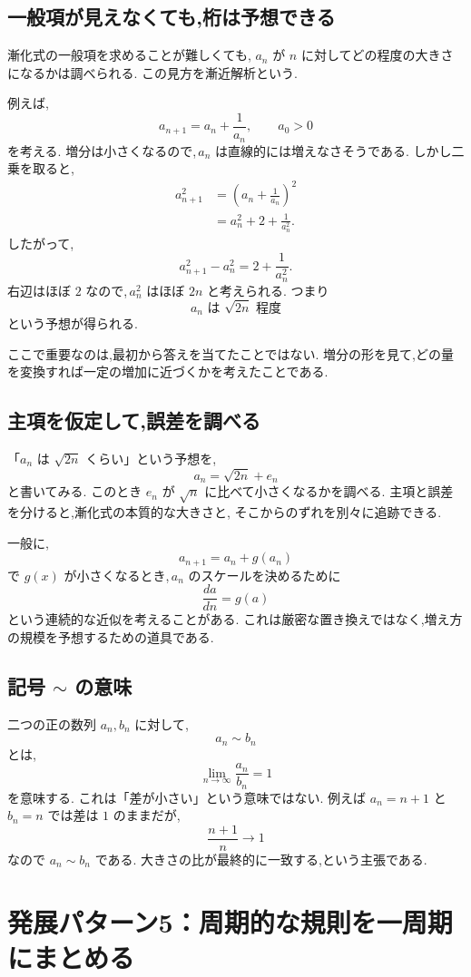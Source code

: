 \subsection{一般項が見えなくても,桁は予想できる}

漸化式の一般項を求めることが難しくても,
$a_n$ が $n$ に対してどの程度の大きさになるかは調べられる.
この見方を漸近解析という.

例えば,
\[
  a_{n+1}=a_n+\frac1{a_n},\qquad a_0>0
\]
を考える.
増分は小さくなるので,\,$a_n$ は直線的には増えなさそうである.
しかし二乗を取ると,
\[
\begin{aligned}
  a_{n+1}^2
  &=\left(a_n+\frac1{a_n}\right)^2\\
  &=a_n^2+2+\frac1{a_n^2}.
\end{aligned}
\]
したがって,
\[
  a_{n+1}^2-a_n^2=2+\frac1{a_n^2}.
\]
右辺はほぼ $2$ なので,\,$a_n^2$ はほぼ $2n$ と考えられる.
つまり
\[
  a_n\text{ は }\sqrt{2n}\text{ 程度}
\]
という予想が得られる.

ここで重要なのは,最初から答えを当てたことではない.
増分の形を見て,どの量を変換すれば一定の増加に近づくかを考えたことである.

\subsection{主項を仮定して,誤差を調べる}

「$a_n$ は $\sqrt{2n}$ くらい」という予想を,
\[
  a_n=\sqrt{2n}+e_n
\]
と書いてみる.
このとき $e_n$ が $\sqrt{n}$ に比べて小さくなるかを調べる.
主項と誤差を分けると,漸化式の本質的な大きさと,
そこからのずれを別々に追跡できる.

一般に,
\[
  a_{n+1}=a_n+g(a_n)
\]
で $g(x)$ が小さくなるとき,\,$a_n$ のスケールを決めるために
\[
  \frac{da}{dn}=g(a)
\]
という連続的な近似を考えることがある.
これは厳密な置き換えではなく,増え方の規模を予想するための道具である.

\subsection{記号 $\sim$ の意味}

二つの正の数列 $a_n,b_n$ に対して,
\[
  a_n\sim b_n
\]
とは,
\[
  \lim_{n\to\infty}\frac{a_n}{b_n}=1
\]
を意味する.
これは「差が小さい」という意味ではない.
例えば $a_n=n+1$ と $b_n=n$ では差は $1$ のままだが,
\[
  \frac{n+1}{n}\longrightarrow1
\]
なので $a_n\sim b_n$ である.
大きさの比が最終的に一致する,という主張である.

\section{発展パターン5：周期的な規則を一周期にまとめる}

